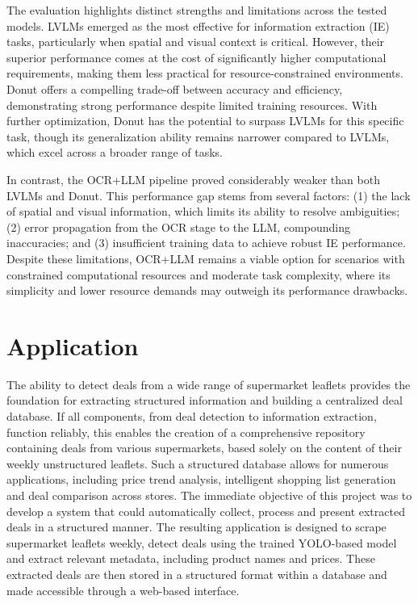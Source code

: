 \documentclass[11pt]{article}
\begin{document}
 The evaluation highlights distinct strengths and limitations across the tested models. LVLMs emerged as the most effective for information extraction (IE) tasks, particularly when spatial and visual context is critical. However, their superior performance comes at the cost of significantly higher computational requirements, making them less practical for resource-constrained environments. Donut offers a compelling trade-off between accuracy and efficiency, demonstrating strong performance despite limited training resources. With further optimization, Donut has the potential to surpass LVLMs for this specific task, though its generalization ability remains narrower compared to LVLMs, which excel across a broader range of tasks.

In contrast, the OCR+LLM pipeline proved considerably weaker than both LVLMs and Donut. This performance gap stems from several factors: (1) the lack of spatial and visual information, which limits its ability to resolve ambiguities; (2) error propagation from the OCR stage to the LLM, compounding inaccuracies; and (3) insufficient training data to achieve robust IE performance. Despite these limitations, OCR+LLM remains a viable option for scenarios with constrained computational resources and moderate task complexity, where its simplicity and lower resource demands may outweigh its performance drawbacks.


\section{Application}
The ability to detect deals from a wide range of supermarket leaflets provides the foundation for extracting structured information and building a centralized deal database. If all components, from deal detection to information extraction, function reliably, this enables the creation of a comprehensive repository containing deals from various supermarkets, based solely on the content of their weekly unstructured leaflets. Such a structured database allows for numerous applications, including price trend analysis, intelligent shopping list generation and deal comparison across stores. The immediate objective of this project was to develop a system that could automatically collect, process and present extracted deals in a structured manner. The resulting application is designed to scrape supermarket leaflets weekly, detect deals using the trained YOLO-based model and extract relevant metadata, including product names and prices. These extracted deals are then stored in a structured format within a database and made accessible through a web-based interface.
\end{document}
